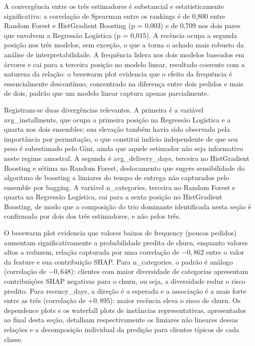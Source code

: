 A convergência entre os três estimadores é substancial e estatisticamente significativa: a correlação de Spearman entre os rankings é de 0,800 entre Random Forest e HistGradient Boosting (p = 0,003) e de 0,709 nos dois pares que envolvem a Regressão Logística (p = 0,015). A recência ocupa a segunda posição nos três modelos, sem exceção, o que a torna o achado mais robusto da análise de interpretabilidade. A frequência lidera nos dois modelos baseados em árvores e cai para a terceira posição no modelo linear, resultado coerente com a natureza da relação: o beeswarm plot evidencia que o efeito da frequência é essencialmente descontínuo, concentrado na diferença entre dois pedidos e mais de dois, padrão que um modelo linear captura apenas parcialmente.

Registram-se duas divergências relevantes. A primeira é a variável avg\_installments, que ocupa a primeira posição na Regressão Logística e a quarta nos dois ensembles; sua elevação também havia sido observada pela importância por permutação, o que constitui indício independente de que seu peso é subestimado pelo Gini, ainda que aquele estimador não seja informativo neste regime amostral. A segunda é avg\_delivery\_days, terceira no HistGradient Boosting e sétima no Random Forest, deslocamento que sugere sensibilidade do algoritmo de boosting a limiares do tempo de entrega não capturados pelo ensemble por bagging. A variável n\_categories, terceira no Random Forest e quarta na Regressão Logística, cai para a sexta posição no HistGradient Boosting, de modo que a composição do trio dominante identificada nesta seção é confirmada por dois dos três estimadores, e não pelos três.

O beeswarm plot evidencia que valores baixos de frequency (poucos pedidos) aumentam significativamente a probabilidade predita de churn, enquanto valores altos a reduzem, relação capturada por uma correlação de $-0{,}862$ entre o valor da feature e sua contribuição SHAP. Para n\_categories, o padrão é análogo (correlação de $-0{,}648$): clientes com maior diversidade de categorias apresentam contribuições SHAP negativas para o churn, ou seja, a diversidade reduz o risco predito. Para recency\_days, a direção é a esperada e a associação é a mais forte entre as três (correlação de $+0{,}895$): maior recência eleva o risco de churn. Os dependence plots e os waterfall plots de instâncias representativas, apresentados ao final desta seção, detalham respectivamente os limiares não lineares dessas relações e a decomposição individual da predição para clientes típicos de cada classe.

